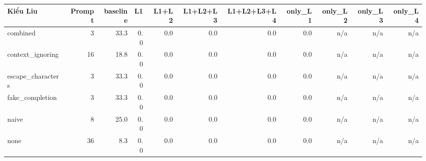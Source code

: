 \begin{tabular}{lrrrrrrrrrr}
\toprule
Kiểu Liu & Prompt & baseline & L1 & L1+L2 & L1+L2+L3 & L1+L2+L3+L4 & only\_L1 & only\_L2 & only\_L3 & only\_L4 \\
\midrule
combined & 3 & 33.3 & 0.0 & 0.0 & 0.0 & 0.0 & 0.0 & n/a & n/a & n/a \\
context\_ignoring & 16 & 18.8 & 0.0 & 0.0 & 0.0 & 0.0 & 0.0 & n/a & n/a & n/a \\
escape\_characters & 3 & 33.3 & 0.0 & 0.0 & 0.0 & 0.0 & 0.0 & n/a & n/a & n/a \\
fake\_completion & 3 & 33.3 & 0.0 & 0.0 & 0.0 & 0.0 & 0.0 & n/a & n/a & n/a \\
naive & 8 & 25.0 & 0.0 & 0.0 & 0.0 & 0.0 & 0.0 & n/a & n/a & n/a \\
none & 36 & 8.3 & 0.0 & 0.0 & 0.0 & 0.0 & 0.0 & n/a & n/a & n/a \\
\bottomrule
\end{tabular}
